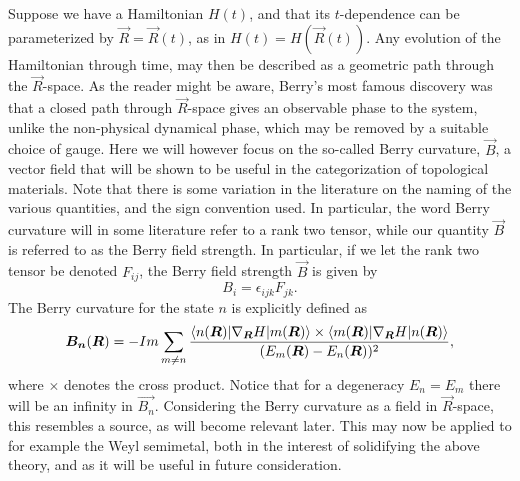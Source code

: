 Suppose we have a Hamiltonian $H(t)$, and that its $t$-dependence can be parameterized by $\vec{R} = \vec{R}(t)$, as in $H(t) = H(\vec{R}(t))$.
Any evolution of the Hamiltonian through time, may then be described as a geometric path through the $\vec{R}$-space.
As the reader might be aware, Berry's most famous discovery was that a closed path through $\vec{R}$-space gives an observable phase to the system, unlike the non-physical dynamical phase, which may be removed by a suitable choice of gauge.
Here we will however focus on the so-called Berry curvature, $\vec{B}$, a vector field that will be shown to be useful in the categorization of topological materials.
Note that there is some variation in the literature on the naming of the various quantities, and the sign convention used.
In particular, the word Berry curvature will in some literature refer to a rank two tensor, while our quantity $\vec{B}$ is referred to as the Berry field strength.
In particular, if we let the rank two tensor be denoted $F_{ij}$, the Berry field strength $\vec{B}$ is given by
\begin{equation}
  B_i = \epsilon_{ijk} F_{jk}.
\end{equation}
The Berry curvature for the state $n$ is explicitly defined as~\cite{berryQuantalPhaseFactors1984}
\begin{equation}
  \bm{B_n}(\bm{R}) =
  -Im \sum_{m\neq n}
  \frac{
    \braket{n(\bm{R}) | \nabla_{\bm{R}} H | m(\bm{R}) }
    \times
    \braket{m(\bm{R}) | \nabla_{\bm{R}} H | n(\bm{R}) }
  }{
    (E_m(\bm{R}) - E_n(\bm{R}))^2
  },
\end{equation}
where $\times $ denotes the cross product.
Notice that for a degeneracy $E_n = E_m$ there will be an infinity in $\vec{B_n}$.
Considering the Berry curvature as a field in $\vec{R}$-space, this resembles a source, as will become relevant later.
This may now be applied to for example the Weyl semimetal, both in the interest of solidifying the above theory, and as it will be useful in future consideration.

